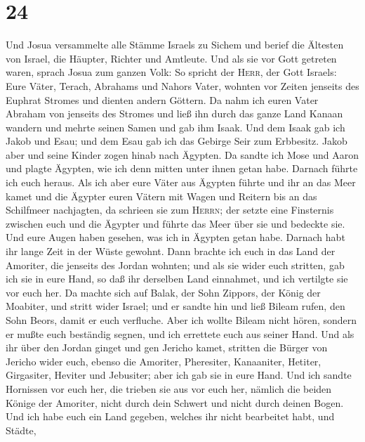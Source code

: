 \hypertarget{section-23}{%
\section{24}\label{section-23}}

 Und Josua versammelte alle Stämme Israels zu Sichem und
berief die Ältesten von Israel, die Häupter, Richter und Amtleute. Und
als sie vor Gott getreten waren,  sprach Josua zum ganzen
Volk: So spricht der \textsc{Herr}, der Gott Israels: Eure Väter,
Terach, Abrahams und Nahors Vater, wohnten vor Zeiten jenseits des
Euphrat Stromes und dienten andern Göttern.  Da nahm ich
euren Vater Abraham von jenseits des Stromes und ließ ihn durch das
ganze Land Kanaan wandern und mehrte seinen Samen und gab ihm Isaak.
 Und dem Isaak gab ich Jakob und Esau; und dem Esau gab
ich das Gebirge Seir zum Erbbesitz. Jakob aber und seine Kinder zogen
hinab nach Ägypten.  Da sandte ich Mose und Aaron und
plagte Ägypten, wie ich denn mitten unter ihnen getan habe.
 Darnach führte ich euch heraus. Als ich aber eure Väter
aus Ägypten führte und ihr an das Meer kamet und die Ägypter euren
Vätern mit Wagen und Reitern bis an das Schilfmeer nachjagten, da
schrieen sie zum \textsc{Herrn};  der setzte eine
Finsternis zwischen euch und die Ägypter und führte das Meer über sie
und bedeckte sie. Und eure Augen haben gesehen, was ich in Ägypten getan
habe. Darnach habt ihr lange Zeit in der Wüste gewohnt. 
Dann brachte ich euch in das Land der Amoriter, die jenseits des Jordan
wohnten; und als sie wider euch stritten, gab ich sie in eure Hand, so
daß ihr derselben Land einnahmet, und ich vertilgte sie vor euch her.
 Da machte sich auf Balak, der Sohn Zippors, der König der
Moabiter, und stritt wider Israel; und er sandte hin und ließ Bileam
rufen, den Sohn Beors, damit er euch verfluche.  Aber ich
wollte Bileam nicht hören, sondern er mußte euch beständig segnen, und
ich errettete euch aus seiner Hand.  Und als ihr über den
Jordan ginget und gen Jericho kamet, stritten die Bürger von Jericho
wider euch, ebenso die Amoriter, Pheresiter, Kanaaniter, Hetiter,
Girgasiter, Heviter und Jebusiter; aber ich gab sie in eure Hand.
 Und ich sandte Hornissen vor euch her, die trieben sie
aus vor euch her, nämlich die beiden Könige der Amoriter, nicht durch
dein Schwert und nicht durch deinen Bogen.  Und ich habe
euch ein Land gegeben, welches ihr nicht bearbeitet habt, und Städte,
